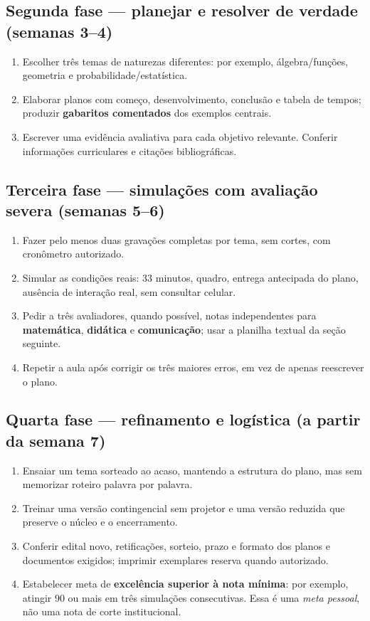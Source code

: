\documentclass[11pt,a4paper]{article}
\begin{document}
\subsection{Segunda fase --- planejar e resolver de verdade (semanas 3--4)}
\begin{enumerate}
\item Escolher três temas de naturezas diferentes: por exemplo, álgebra/funções, geometria e probabilidade/estatística.
\item Elaborar planos com começo, desenvolvimento, conclusão e tabela de tempos; produzir \textbf{gabaritos comentados} dos exemplos centrais.
\item Escrever uma evidência avaliativa para cada objetivo relevante. Conferir informações curriculares e citações bibliográficas.
\end{enumerate}

\subsection{Terceira fase --- simulações com avaliação severa (semanas 5--6)}
\begin{enumerate}
\item Fazer pelo menos duas gravações completas por tema, sem cortes, com cronômetro autorizado.
\item Simular as condições reais: 33 minutos, quadro, entrega antecipada do plano, ausência de interação real, sem consultar celular.
\item Pedir a três avaliadores, quando possível, notas independentes para \textbf{matemática}, \textbf{didática} e \textbf{comunicação}; usar a planilha textual da seção seguinte.
\item Repetir a aula após corrigir os três maiores erros, em vez de apenas reescrever o plano.
\end{enumerate}

\subsection{Quarta fase --- refinamento e logística (a partir da semana 7)}
\begin{enumerate}
\item Ensaiar um tema sorteado ao acaso, mantendo a estrutura do plano, mas sem memorizar roteiro palavra por palavra.
\item Treinar uma versão contingencial sem projetor e uma versão reduzida que preserve o núcleo e o encerramento.
\item Conferir edital novo, retificações, sorteio, prazo e formato dos planos e documentos exigidos; imprimir exemplares reserva quando autorizado.
\item Estabelecer meta de \textbf{excelência superior à nota mínima}: por exemplo, atingir 90 ou mais em três simulações consecutivas. Essa é uma \textit{meta pessoal}, não uma nota de corte institucional.
\end{enumerate}
\end{document}
